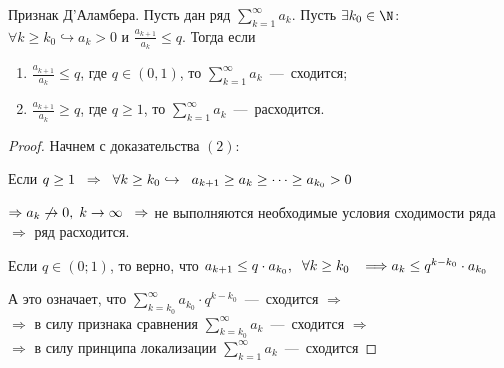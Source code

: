 \begin{theorem} Признак Д'Аламбера.
    Пусть дан ряд $\sum_{k = 1}^{\infty} a_k$. Пусть $\exists k_0 \in \N$: $\forall k \geq k_0 \hookrightarrow a_k > 0$ и $\frac{a_{k+1}}{a_k} \leq q$. Тогда если
    \begin{enumerate}
        \item $\frac{a_{k+1}}{a_k} \leq q$, где $q \in (0, 1)$, то $\sum_{k = 1}^{\infty}a_k$~---~сходится;
        \item $\frac{a_{k+1}}{a_k} \geq q$, где $q \geq 1$, то  $\sum_{k = 1}^{\infty}a_k$~---~расходится.
    \end{enumerate} 
\end{theorem}
\begin{proof}
    Начнем с доказательства $(2)$:

    Если $q \geq 1 \hspace{0.2cm} \Rightarrow \hspace{0.2cm} \forall k \geq k_0 \hookrightarrow \hspace{0.2cm} a_{k+1} \geq a_k \geq \dots \geq a_{k_0} > 0$ 

    $\Rightarrow a_k \not \rightarrow 0, \hspace{0.1cm} k \rightarrow \infty \hspace{0.2cm} \Rightarrow $ не выполняются необходимые условия сходимости ряда $\Rightarrow$ ряд расходится.

    Если $q \in (0; 1)$, то верно, что $a_{k+1} \leq q \cdot a_{k_0}, \hspace{0.2cm} \forall k \geq k_0 \hspace{0.3cm} \Longrightarrow a_k \leq q^{k - k_0} \cdot a_{k_0}$ 

    А это означает, что $\sum_{k = k_0}^{\infty}a_{k_0}\cdot q^{k - k_0}$~---~сходится $\Rightarrow$ \\ $\Rightarrow$ в силу признака сравнения $\sum_{k=k_0}^{\infty} a_k$~---~сходится $\Rightarrow$ \\ $\Rightarrow$ в силу принципа локализации $\sum_{k=1}^{\infty} a_k$~---~сходится
\end{proof}

